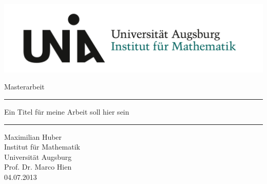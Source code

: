 
\begin{titlepage}
  \thispagestyle{empty}
  \includegraphics[width=\textwidth]{logo/Uni_Aug_Logo_IFM_RGB-crop.png}
  \newcommand{\Rule}{%
    \textcolor{black}{\rule{\textwidth}{0.5mm}}%
  }
  \begin{center}\sffamily
    \normalfont\sffamily\large
    Masterarbeit
    \Rule
    \vspace{5mm}
    \Huge{Ein Titel für meine Arbeit soll hier sein}
    \vspace{1mm}
    \Rule
  \end{center}
  \normalfont\sffamily\Large Maximilian Huber
  \\
  \normalfont\sffamily\Large Institut für Mathematik
  \\
  \normalfont\sffamily\Large Universität Augsburg
  \\
  \normalfont\sffamily\Large Prof. Dr. Marco Hien
  \\
  \normalfont\sffamily\Large 04.07.2013
  \vfill
  \vfill
\end{titlepage}

